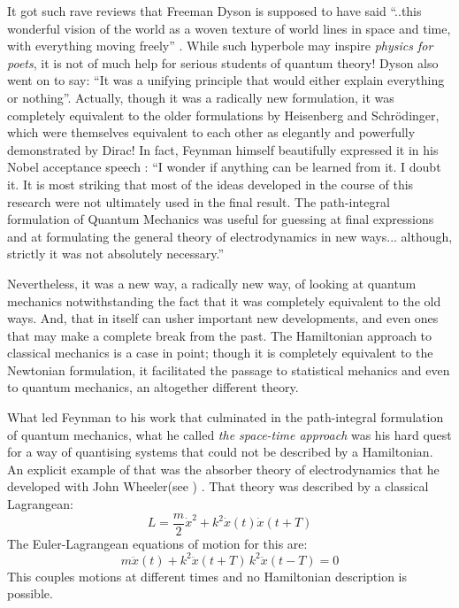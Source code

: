 \documentclass[12pt]{article}
\newcommand{\be}{\begin{equation}}
\newcommand{\ee}{\end{equation}}
\begin{document}
It got such rave reviews that Freeman Dyson is supposed to have said ``..this wonderful vision of the world as a woven texture of world lines in space and time, with everything moving freely'' \cite{gleick}. While such hyperbole may inspire {\it physics for poets}, it is not of much
help for serious students of quantum theory! Dyson also went on to say: ``It was a unifying principle that would either explain everything or nothing''. Actually, though it was a radically new formulation, it was completely equivalent to the older formulations by Heisenberg and Schr\"odinger, which were themselves equivalent to each other as elegantly and powerfully demonstrated by Dirac! In fact, Feynman himself beautifully
expressed it in his Nobel acceptance speech \cite{nobel}: ``I wonder if anything can be learned from it. I doubt it. It is most striking that 
most of the ideas developed in the course of this research were not ultimately used in the final result. The path-integral formulation of 
Quantum Mechanics was useful for guessing at final expressions and at formulating the general theory of electrodynamics in new ways...
although, strictly it was not absolutely necessary.''

Nevertheless, it was a new way, a radically new way, of looking at quantum mechanics notwithstanding the fact that it was completely equivalent
to the old ways. And, that in itself can usher important new developments, and even ones that may make a complete break from the past. The
Hamiltonian approach to classical mechanics is a case in point; though it is completely equivalent to the Newtonian formulation, it facilitated
the passage to statistical mehanics and even to quantum mechanics, an altogether different theory.

What led Feynman to his work that culminated in the path-integral formulation of quantum mechanics, what he called {\it the space-time
approach}\cite{feynpaper} was his hard quest for a way of quantising systems that could not be described by a Hamiltonian. An explicit
example of that was the absorber theory of electrodynamics that he developed with John Wheeler(see \cite{thesis}) . That theory was
described by a classical Lagrangean: 
\be
\label{eq:absorberL}
L = \frac{m}{2}{\dot x}^2 + k^2{\dot x}(t){\dot x}(t + T)
\ee
The Euler-Lagrangean equations of motion for this are:
\be
\label{eq:absorberEOM}
m{\ddot x}(t) + k^2{\ddot x}(t + T)\,k^2{\ddot x}(t - T) = 0
\ee
This couples motions at different times and no Hamiltonian description is possible.
\end{document}
